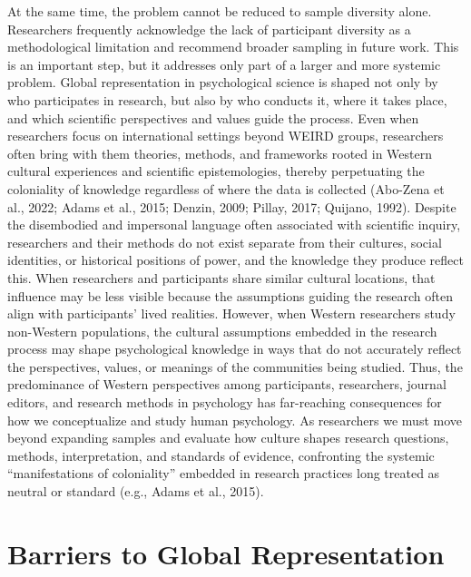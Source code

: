 \documentclass[
  11pt,
]{book}
\begin{document}
At the same time, the problem cannot be reduced to sample diversity alone. Researchers frequently acknowledge the lack of participant diversity as a methodological limitation and recommend broader sampling in future work. This is an important step, but it addresses only part of a larger and more systemic problem. Global representation in psychological science is shaped not only by who participates in research, but also by who conducts it, where it takes place, and which scientific perspectives and values guide the process. Even when researchers focus on international settings beyond WEIRD groups, researchers often bring with them theories, methods, and frameworks rooted in Western cultural experiences and scientific epistemologies, thereby perpetuating the coloniality of knowledge regardless of where the data is collected (Abo-Zena et al., 2022; Adams et al., 2015; Denzin, 2009; Pillay, 2017; Quijano, 1992). Despite the disembodied and impersonal language often associated with scientific inquiry, researchers and their methods do not exist separate from their cultures, social identities, or historical positions of power, and the knowledge they produce reflect this. When researchers and participants share similar cultural locations, that influence may be less visible because the assumptions guiding the research often align with participants' lived realities. However, when Western researchers study non-Western populations, the cultural assumptions embedded in the research process may shape psychological knowledge in ways that do not accurately reflect the perspectives, values, or meanings of the communities being studied. Thus, the predominance of Western perspectives among participants, researchers, journal editors, and research methods in psychology has far-reaching consequences for how we conceptualize and study human psychology. As researchers we must move beyond expanding samples and evaluate how culture shapes research questions, methods, interpretation, and standards of evidence, confronting the systemic ``manifestations of coloniality'' embedded in research practices long treated as neutral or standard (e.g., Adams et al., 2015).

\section{Barriers to Global Representation}\label{barriers-to-global-representation}
\end{document}
